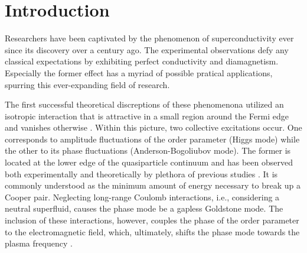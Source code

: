 \documentclass[
    reprint, 
    aps,
    preprintnumbers,
    twocolumn,
    prb,
    superscriptaddress
]{revtex4-2}
\begin{document}

\section{Introduction}\label{sec:introduction}

Researchers have been captivated by the phenomenon of superconductivity ever since its discovery over a century ago.
The experimental observations defy any classical expectations by exhibiting perfect conductivity and diamagnetism.
Especially the former effect has a myriad of possible pratical applications, spurring this ever-expanding field of research.

The first successful theoretical discreptions of these phenomenona utilized an isotropic interaction that is attractive in a small region around the Fermi edge and vanishes otherwise \cite{bardeen1957,bogoliubov1958}.
Within this picture, two collective excitations occur.
One corresponds to amplitude fluctuations of the order parameter (Higgs mode) while the other to its phase fluctuations (Anderson-Bogoliubov mode).
The former is located at the lower edge of the quasiparticle continuum and has been observed both experimentally and theoretically by plethora of previous studies \cite{schmid1975,varma2002,cea2014,measson2014,tsuji2015,reinhoffer2022,sulaiman2024,fischer2018,althuser2024}. 
It is commonly understood as the minimum amount of energy necessary to break up a Cooper pair.
Neglecting long-range Coulomb interactions, i.e., considering a neutral superfluid, causes the phase mode be a gapless Goldstone mode.
The inclusion of these interactions, however, couples the phase of the order parameter to the electromagnetic field, which, ultimately, shifts the phase mode towards the plasma frequency \cite{anderson1958,bogoliubov1958,brieskorn1974,schmid1975,simanek1975,schon1976,kulik1981,maiti2015,fischer2018,sun2020,fan2022,althuser2024}.
\end{document}
